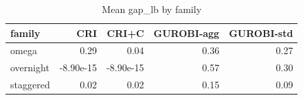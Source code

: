 \begin{table}[htbp]
\centering
\small
\caption{Mean gap\_lb by family}
\label{tab:E3_long_runs_b600_by_family}
\begin{tabular}{lrrrr}
\toprule
family & CRI & CRI+C & GUROBI-agg & GUROBI-std \\
\midrule
omega & 0.29 & 0.04 & 0.36 & 0.27 \\
overnight & -8.90e-15 & -8.90e-15 & 0.57 & 0.30 \\
staggered & 0.02 & 0.02 & 0.15 & 0.09 \\
\bottomrule
\end{tabular}
\end{table}
